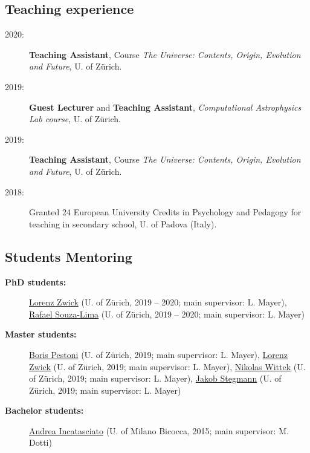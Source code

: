\subsection*{Teaching experience}

\begin{description}

    \item[2020:] 
    \textbf{Teaching Assistant}, Course \textit{The Universe: Contents, Origin, Evolution and Future}, U. of Z\"urich.
    
    \item[2019:] \textbf{Guest Lecturer} and \textbf{Teaching Assistant},   \textit{Computational Astrophysics Lab course}, U. of Z\"urich. %

    \item[2019:] 
    \textbf{Teaching Assistant}, Course \textit{The Universe: Contents, Origin, Evolution and Future}, U. of Z\"urich.

    \item[2018:] Granted 24 European University Credits in Psychology and Pedagogy for teaching in secondary school, U. of Padova (Italy).
\end{description}

\subsection*{Students Mentoring}

\begin{description}

    
    \item[\bf PhD students:] \underline{Lorenz Zwick} (U. of Z\"urich, 2019 -- 2020; main supervisor: L. Mayer), \underline{Rafael Souza-Lima} (U. of Z\"urich, 2019 -- 2020; main supervisor: L. Mayer)

    \item[\bf Master students:] \underline{Boris Pestoni} (U. of Z\"urich, 2019; main supervisor: L. Mayer), \underline{Lorenz Zwick} (U. of Z\"urich, 2019; main supervisor: L. Mayer), \underline{Nikolas Wittek} (U. of Z\"urich, 2019; main supervisor: L. Mayer), \underline{Jakob Stegmann} (U. of Z\"urich, 2019; main supervisor: L. Mayer)
    
    \item[\bf Bachelor students:]  \underline{Andrea Incatasciato} (U. of Milano Bicocca, 2015; main supervisor: M. Dotti)


\end{description}

